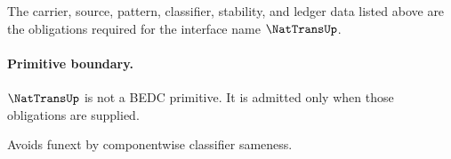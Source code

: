 \begin{definition}
\label{def:nattrans-certificate-obligations}
The carrier, source, pattern, classifier, stability, and ledger data listed above are the obligations required for the interface name \(\NatTransUp\).
\end{definition}

\paragraph{Primitive boundary.}
\(\NatTransUp\) is not a BEDC primitive. It is admitted only when those obligations are supplied.

\begin{remark}
\label{rem:nattrans-zero-axiom-note}
Avoids funext by componentwise classifier sameness.
\end{remark}
